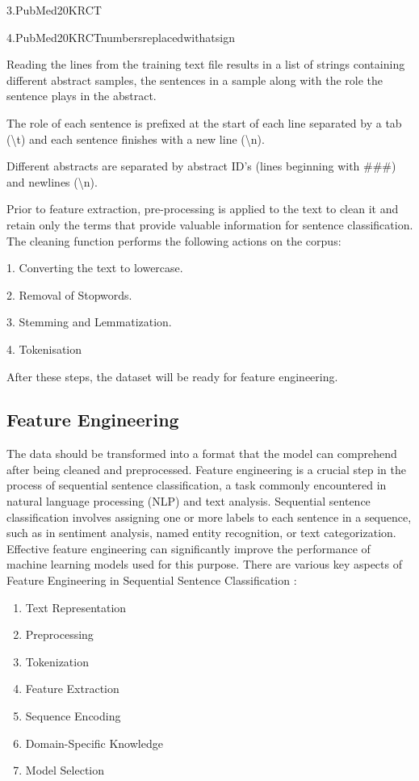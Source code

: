 \documentclass[conference]{IEEEtran}
\begin{document}
3.PubMed\textunderscore20K\textunderscore RCT

4.PubMed\textunderscore20K\textunderscore RCT\textunderscore numbers\textunderscore replaced\textunderscore with\textunderscore at\textunderscore sign

Reading the lines from the training text file results in a list of strings containing different abstract samples, the sentences in a sample along with the role the sentence plays in the abstract.

The role of each sentence is prefixed at the start of each line separated by a tab (\textbackslash t) and each sentence finishes with a new line (\textbackslash n).

Different abstracts are separated by abstract ID's (lines beginning with \#\#\#) and newlines (\textbackslash n).

Prior to feature extraction, pre-processing is applied to the text to clean it and retain only the terms that provide valuable information for sentence classification. The cleaning function performs the following actions on the corpus:

1. Converting the text to lowercase.

2. Removal of Stopwords.

3. Stemming and Lemmatization. 

4. Tokenisation

After these steps, the dataset will be ready for feature engineering. 

\subsection{Feature Engineering}

The data should be transformed into a format that the
model can comprehend after being cleaned and preprocessed.
Feature engineering is a crucial step in the process of sequential sentence classification, a task commonly encountered in natural language processing (NLP) and text analysis. Sequential sentence classification involves assigning one or more labels to each sentence in a sequence, such as in sentiment analysis, named entity recognition, or text categorization. Effective feature engineering can significantly improve the performance of machine learning models used for this purpose.
There are various key aspects of Feature Engineering in Sequential Sentence Classification : 
\begin{enumerate}
    \item Text Representation
    \item Preprocessing
    \item Tokenization
    \item Feature Extraction
    \item Sequence Encoding
    \item Domain-Specific Knowledge
    \item Model Selection
\end{enumerate}
\end{document}
